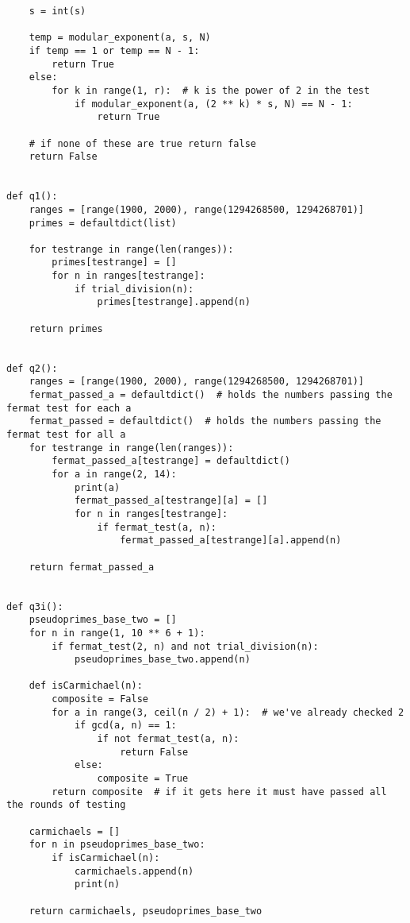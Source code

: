 \documentclass[10pt,a4paper]{report}
\begin{document}
\begin{verbatim}
    s = int(s)

    temp = modular_exponent(a, s, N)
    if temp == 1 or temp == N - 1:
        return True
    else:
        for k in range(1, r):  # k is the power of 2 in the test
            if modular_exponent(a, (2 ** k) * s, N) == N - 1:
                return True

    # if none of these are true return false
    return False


def q1():
    ranges = [range(1900, 2000), range(1294268500, 1294268701)]
    primes = defaultdict(list)

    for testrange in range(len(ranges)):
        primes[testrange] = []
        for n in ranges[testrange]:
            if trial_division(n):
                primes[testrange].append(n)

    return primes


def q2():
    ranges = [range(1900, 2000), range(1294268500, 1294268701)]
    fermat_passed_a = defaultdict()  # holds the numbers passing the fermat test for each a
    fermat_passed = defaultdict()  # holds the numbers passing the fermat test for all a
    for testrange in range(len(ranges)):
        fermat_passed_a[testrange] = defaultdict()
        for a in range(2, 14):
            print(a)
            fermat_passed_a[testrange][a] = []
            for n in ranges[testrange]:
                if fermat_test(a, n):
                    fermat_passed_a[testrange][a].append(n)

    return fermat_passed_a


def q3i():
    pseudoprimes_base_two = []
    for n in range(1, 10 ** 6 + 1):
        if fermat_test(2, n) and not trial_division(n):
            pseudoprimes_base_two.append(n)

    def isCarmichael(n):
        composite = False
        for a in range(3, ceil(n / 2) + 1):  # we've already checked 2
            if gcd(a, n) == 1:
                if not fermat_test(a, n):
                    return False
            else:
                composite = True
        return composite  # if it gets here it must have passed all the rounds of testing

    carmichaels = []
    for n in pseudoprimes_base_two:
        if isCarmichael(n):
            carmichaels.append(n)
            print(n)

    return carmichaels, pseudoprimes_base_two



\end{verbatim}
\end{document}
